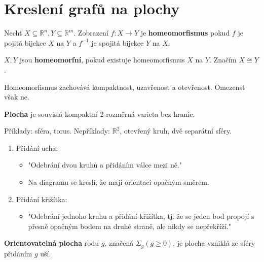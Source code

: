 \chapter{Kreslení grafů na plochy}

\begin{definice}
	Nechť $X \subseteq \mathbb{R}^{n}, Y \subseteq \mathbb{R}^{m}$. Zobrazení $f: X \to Y$ je \textbf{homeomorfismus} pokud $f$ je pojitá bijekce $X$ na $Y$ a $f^{-1}$ je spojitá bijekce $Y$ na $X$.
\end{definice}

\begin{definice}
	$X,Y$ jsou \textbf{homeomorfní}, pokud existuje homeomorfismus $X$ na $Y$. Značím $X \cong Y$.
\end{definice}

\begin{fakt}
	Homeomorfismus zachovává kompaktnost, uzavřenost a otevřenost. Omezenst však ne.
\end{fakt}

\begin{definice}
	\textbf{Plocha} je souvislá kompaktní 2-rozměrná varieta bez hranic.
\end{definice}

\begin{prikl}
	Příklady: sféra, torus. Nepříklady: $\mathbb{R}^{2}$, otevřený kruh, dvě separátní sféry.
\end{prikl}

\begin{definice}
	\begin{enumerate}
		\item Přidání ucha:
		\begin{itemize}
			\item "Odebrání dvou kruhů a přidáním válce mezi ně."
			\item Na diagramu se kreslí, že mají orientaci opačným směrem.
		\end{itemize}
		\item Přidání křižítka:
		\begin{itemize}
			\item "Odebrání jednoho kruhu a přidání křižítka, tj. že se jeden bod propojí s přesně opačným bodem na druhé straně, ale nikdy se nepřekříží."
		\end{itemize}
	\end{enumerate}
\end{definice}

\begin{definice}
	\textbf{Orientovatelná plocha} rodu $g$, značená $\Sigma_{g} (g \geq 0)$, je plocha vzniklá ze sféry přidáním $g$ uší.
\end{definice}

